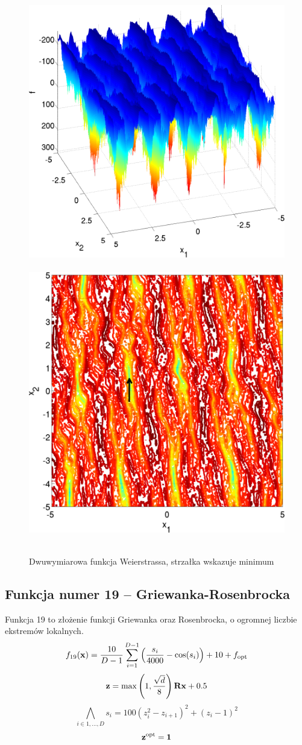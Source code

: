 \documentclass[a4paper,onecolumn,oneside,12pt,wide,floatssmall]{mwrep}
\theoremstyle{definition}
\theoremstyle{plain}%
\theoremstyle{remark}
\begin{document}
\begin{figure}[H]
\centering
\mbox{
\includegraphics[width=.45\textwidth]{img/16.png} \quad
\includegraphics[width=.45\textwidth]{img/16a.png} 
}
\caption{Dwuwymiarowa funkcja Weierstrassa, strzałka wskazuje minimum \cite{noiseless}}
\end{figure}

\subsection{Funkcja numer 19 -- Griewanka-Rosenbrocka}

Funkcja 19 to złożenie funkcji Griewanka oraz Rosenbrocka, o ogromnej liczbie ekstremów lokalnych.
$$ f_{19}(\bold{x}) = \frac{10}{D - 1} \sum^{D-1}_{i=1}\left(\frac{s_i}{4000} - \cos(s_i)\right) + 10 + f_\text{opt} $$
$$ \bold{z} = \max\left(1, \frac{\sqrt{d}}{8}\right) \bold{Rx} + 0.5 $$
$$ \bigwedge_{i \in 1, \dots, D} s_i = 100(z^2_i - z_{i+1})^2 + (z_i - 1)^2 $$
$$ \bold{z}^\text{opt} = \bold{1} $$
\end{document}

